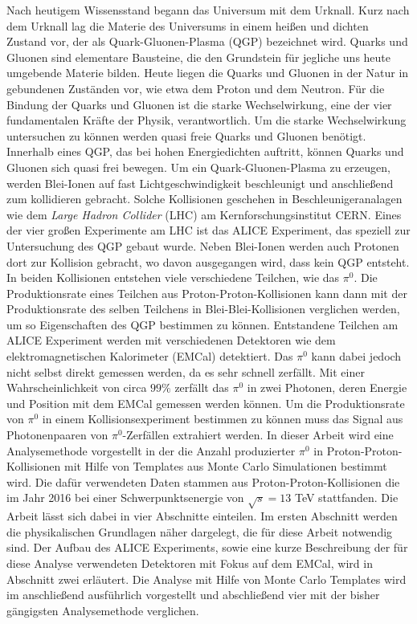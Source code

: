 Nach heutigem Wissensstand begann das Universum mit dem Urknall.
Kurz nach dem Urknall lag die Materie des Universums in einem heißen und dichten Zustand vor, der als Quark-Gluonen-Plasma (QGP) bezeichnet wird.
Quarks und Gluonen sind elementare Bausteine, die den Grundstein für jegliche uns heute umgebende Materie bilden.
Heute liegen die Quarks und Gluonen in der Natur in gebundenen Zuständen vor, wie etwa dem Proton und dem Neutron.
\newline
Für die Bindung der Quarks und Gluonen ist die starke Wechselwirkung, eine der vier fundamentalen Kräfte der Physik, verantwortlich.
Um die starke Wechselwirkung untersuchen zu können werden quasi freie Quarks und Gluonen benötigt.
Innerhalb eines QGP, das bei hohen Energiedichten auftritt, können Quarks und Gluonen sich quasi frei bewegen.
\newline
Um ein Quark-Gluonen-Plasma zu erzeugen, werden Blei-Ionen auf fast Lichtgeschwindigkeit beschleunigt und anschließend zum kollidieren gebracht.
Solche Kollisionen geschehen in Beschleunigeranalagen wie dem \textit{Large Hadron Collider} (LHC) am Kernforschungsinstitut CERN.
Eines der vier großen Experimente am LHC ist das ALICE Experiment, das speziell zur Untersuchung des QGP gebaut wurde.
\newline
Neben Blei-Ionen werden auch Protonen dort zur Kollision gebracht, wo davon ausgegangen wird, dass kein QGP entsteht.
In beiden Kollisionen entstehen viele verschiedene Teilchen, wie das $\pi^{0}$.
Die Produktionsrate eines Teilchen aus Proton-Proton-Kollisionen kann dann mit der Produktionsrate des selben Teilchens in Blei-Blei-Kollisionen verglichen werden, um so Eigenschaften des QGP bestimmen zu können.
\newline
Entstandene Teilchen am ALICE Experiment werden mit verschiedenen Detektoren wie dem elektromagnetischen Kalorimeter (EMCal) detektiert.
Das $\pi^{0}$ kann dabei jedoch nicht selbst direkt gemessen werden, da es sehr schnell zerfällt.
Mit einer Wahrscheinlichkeit von circa $99\%$ zerfällt das $\pi^{0}$ in zwei Photonen, deren Energie und Position mit dem EMCal gemessen werden können.
Um die Produktionsrate von $\pi^{0}$ in einem Kollisionsexperiment bestimmen zu können muss das Signal aus Photonenpaaren von $\pi^{0}$-Zerfällen extrahiert werden.
\newline
In dieser Arbeit wird eine Analysemethode vorgestellt in der die Anzahl produzierter $\pi^{0}$ in Proton-Proton-Kollisionen mit Hilfe von Templates aus Monte Carlo Simulationen bestimmt wird.
Die dafür verwendeten Daten stammen aus Proton-Proton-Kollisionen die im Jahr 2016 bei einer Schwer\-punkts\-en\-er\-gie von $\sqrt{s}=13$ TeV stattfanden.
\newline
Die Arbeit lässt sich dabei in vier Abschnitte einteilen.
Im ersten Abschnitt werden die physikalischen Grundlagen näher dargelegt, die für diese Arbeit notwendig sind.
Der Aufbau des ALICE Experiments, sowie eine kurze Beschreibung der für diese Analyse verwendeten Detektoren mit Fokus auf dem EMCal, wird in Abschnitt zwei erläutert.
Die Analyse mit Hilfe von Monte Carlo Templates wird im anschließend ausführlich vorgestellt und abschließend vier mit der bisher gängigsten Analysemethode verglichen.